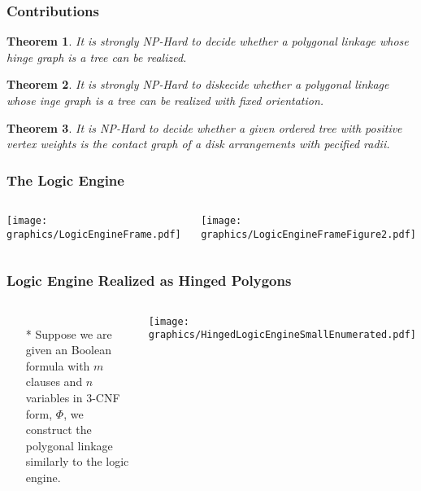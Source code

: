 \documentclass{beamer}
\newtheorem{thm}{Theorem}
\begin{document}
\begin{frame}\frametitle{Contributions}
     \begin{thm}
     It is strongly NP-Hard to decide whether a polygonal linkage whose hinge graph is a \textit{tree} can be realized.
     \end{thm}

    \begin{thm}It is strongly NP-Hard to diskecide whether a polygonal linkage whose inge graph is a \textit{tree} can be realized with fixed orientation.\end{thm}
    \begin{thm}It is NP-Hard to decide whether a given ordered tree with positive vertex weights is the contact graph of a disk arrangements with pecified radii.\end{thm}
\end{frame}

\begin{frame} \frametitle{The Logic Engine}
    \begin{columns}[c]
        \begin{minipage}{\linewidth}
            \begin{center}
            \texttt{[image: graphics/LogicEngineFrame.pdf]}
            \end{center}
        \end{minipage}
        \begin{minipage}{\linewidth}
            \begin{center}
            \texttt{[image: graphics/LogicEngineFrameFigure2.pdf]}
            \end{center}
        \end{minipage}
    \end{columns}
\end{frame}

\begin{frame} \frametitle{Logic Engine Realized as Hinged Polygons}
    \begin{columns}[c]
        \begin{itemize}
            \item[*] Suppose we are given an Boolean formula with $m$ clauses and $n$ variables in 3-CNF form, $\Phi$, we construct the polygonal linkage similarly to the logic engine.
        \end{itemize}
        \begin{minipage}{\linewidth}
            \begin{center}
            \texttt{[image: graphics/HingedLogicEngineSmallEnumerated.pdf]}
            \end{center}
        \end{minipage}
    \end{columns}
\end{frame}
\end{document}
